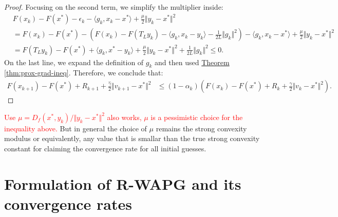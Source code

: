 \documentclass[12pt]{article}
\begin{document}
\begin{proof}
        Focusing on the second term, we simplify the multiplier inside: 
        {\small
        \begin{align*}
            & F(x_k) - F(x^*) - \epsilon_k - \langle g_k, x_k - x^*\rangle + \frac{\mu}{2}\Vert y_k - x^*\Vert^2
            \\
            &= 
            F(x_k) - F(x^*) - \left(
                F(x_k) - F(T_L y_k) - \langle g_k, x_k - y_k\rangle - \frac{1}{2L}\Vert g_k\Vert^2
            \right)- \langle g_k, x_k - x^*\rangle + \frac{\mu}{2}\Vert y_k - x^*\Vert^2
            \\
            &= F(T_L y_k) - F(x^*) + \langle g_k, x^* - y_k\rangle + \frac{\mu}{2}\Vert y_k - x^*\Vert^2
            + \frac{1}{2L}\Vert g_k\Vert^2 \le 0. 
        \tag{4*}    
        \end{align*}
        }
        On the last line, we expand the definition of $g_k$ and then used 
        \hyperref[thm:prox-grad-ineq]{Theorem \ref*{thm:prox-grad-ineq}}. 
        Therefore, we conclude that: 
        {\small
        \begin{align*}
            F(x_{k + 1}) - F(x^*) + R_{k + 1} + 
            \frac{\hat \gamma}{2}\Vert v_{k + 1} - x^*\Vert^2
            &\le 
            (1 - \alpha_k)\left(
                F(x_k) - F(x^*) + R_k + \frac{\gamma}{2}\Vert v_k - x^*\Vert^2
            \right). 
        \end{align*}
        }
    \end{proof}
    \begin{remark}
        \textcolor{red}
        {
        Use $\mu = D_f(x^*, y_k)/\Vert y_k - x^*\Vert^2$ also works, $\mu$ is a pessimistic choice for the inequality above. 
        }
        But in general the choice of $\mu$ remains the strong convexity modulus or equivalently, any value that is smallar than the true strong convexity constant for claiming the convergence rate for all initial guesses. 
    \end{remark}

\section{Formulation of R-WAPG and its convergence rates}
\end{document}

